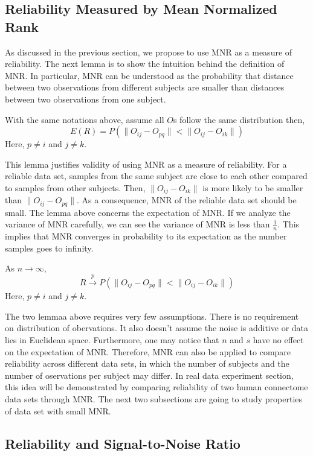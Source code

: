 \documentclass{article}
\begin{document}
\subsection{Reliability Measured by Mean Normalized Rank}

As discussed in the previous section, we propose to use MNR as a measure of reliability. The next lemma is to show the intuition behind the definition of MNR. In particular, MNR can be understood as the probability that distance between two observations from different subjects are smaller than distances between two observations from one subject.
\begin{lemma} 
With the same notations above, assume all $O$s follow the same distribution then,
\[ E(R) = P(\|O_{ij}-O_{pq}\| < \|O_{ij}-O_{ik}\|)\]
Here, $p\neq i$ and $j\neq k$.
\end{lemma} 
\noindent This lemma justifies validity of using MNR as a measure of reliability. For a reliable data set, samples from the same subject are close to each other compared to samples from other subjects. Then, $\|O_{ij}-O_{ik}\|$ is more likely to be smaller than $\|O_{ij}-O_{pq}\|$. As a consequence, MNR of the reliable data set should be small. The lemma above concerns the expectation of MNR. If we analyze the variance of MNR carefully, we can see the variance of MNR is less than $\frac{1}{n}$. This implies that MNR converges in probability to its expectation as the number samples goes to infinity. 
\begin{lemma} 
As $n \rightarrow \infty$,
\[R \xrightarrow[]{p} P(\|O_{ij}-O_{pq}\| < \|O_{ij}-O_{ik}\|)\]
Here, $p\neq i$ and $j\neq k$.
\end{lemma} 
\noindent The two lemmaa above requires very few assumptions. There is no requirement on distribution of obervations. It also doesn't assume the noise is additive or data lies in Euclidean space. Furthermore, one may notice that $n$ and $s$ have no effect on the expectation of MNR. Therefore, MNR can also be applied to compare reliability across different data sets, in which the number of subjects and the number of oservations per subject may differ. In real data experiment section, this idea will be demonstrated by comparing reliability of two human connectome data sets through MNR. The next two subsections are going to study properties of data set with small MNR.

\subsection{Reliability and Signal-to-Noise Ratio}
\end{document}
